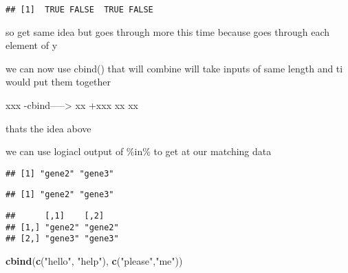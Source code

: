 \documentclass[]{article}
\newenvironment{Shaded}{\begin{snugshade}}{\end{snugshade}}
\newcommand{\KeywordTok}[1]{\textcolor[rgb]{0.13,0.29,0.53}{\textbf{#1}}}
\newcommand{\StringTok}[1]{\textcolor[rgb]{0.31,0.60,0.02}{#1}}
\newcommand{\OperatorTok}[1]{\textcolor[rgb]{0.81,0.36,0.00}{\textbf{#1}}}
\newcommand{\NormalTok}[1]{#1}
\begin{document}
\begin{verbatim}
## [1]  TRUE FALSE  TRUE FALSE
\end{verbatim}

so get same idea but goes through more this time because goes through
each element of y

we can now use cbind() that will combine will take inputs of same length
and ti would put them together

xxx -cbind-----\textgreater{} xx +xxx xx xx

thats the idea above

we can use logiacl output of \%in\% to get at our matching data

\begin{Shaded}
\end{Shaded}

\begin{verbatim}
## [1] "gene2" "gene3"
\end{verbatim}

\begin{Shaded}
\end{Shaded}

\begin{verbatim}
## [1] "gene2" "gene3"
\end{verbatim}

\begin{Shaded}
\end{Shaded}

\begin{verbatim}
##      [,1]    [,2]   
## [1,] "gene2" "gene2"
## [2,] "gene3" "gene3"
\end{verbatim}

\begin{Shaded}
\begin{Highlighting}[]
\KeywordTok{cbind}\NormalTok{(}\KeywordTok{c}\NormalTok{(}\StringTok{"hello"}\NormalTok{, }\StringTok{"help"}\NormalTok{), }\KeywordTok{c}\NormalTok{(}\StringTok{"please"}\NormalTok{,}\StringTok{"me"}\NormalTok{))}
\end{Highlighting}
\end{Shaded}
\end{document}
